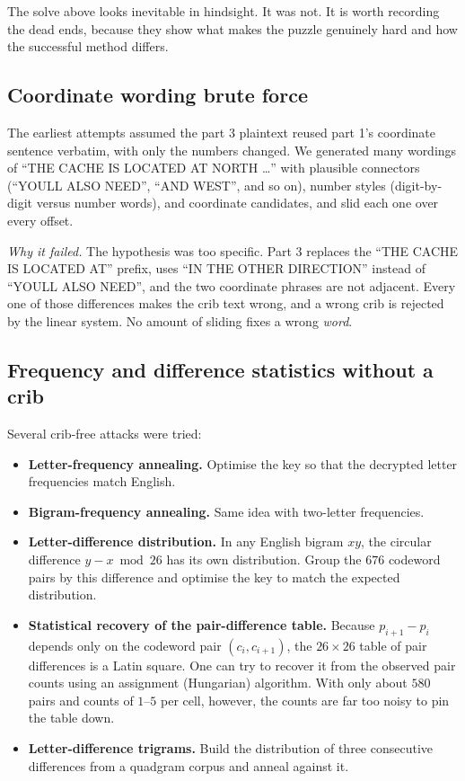 \documentclass[11pt]{article}
\begin{document}
The solve above looks inevitable in hindsight.  It was not.  It is worth
recording the dead ends, because they show what makes the puzzle genuinely
hard and how the successful method differs.

\subsection{Coordinate wording brute force}

The earliest attempts assumed the part 3 plaintext reused part 1's coordinate
sentence verbatim, with only the numbers changed.  We generated many wordings
of ``THE CACHE IS LOCATED AT NORTH \dots'' with plausible connectors
(``YOULL ALSO NEED'', ``AND WEST'', and so on), number styles (digit-by-digit
versus number words), and coordinate candidates, and slid each one over every
offset.

\emph{Why it failed.}  The hypothesis was too specific.  Part 3 replaces the
``THE CACHE IS LOCATED AT'' prefix, uses ``IN THE OTHER DIRECTION'' instead of
``YOULL ALSO NEED'', and the two coordinate phrases are not adjacent.  Every
one of those differences makes the crib text wrong, and a wrong crib is
rejected by the linear system.  No amount of sliding fixes a wrong \emph{word}.

\subsection{Frequency and difference statistics without a crib}

Several crib-free attacks were tried:

\begin{itemize}
  \item \textbf{Letter-frequency annealing.} Optimise the key so that the
        decrypted letter frequencies match English.
  \item \textbf{Bigram-frequency annealing.} Same idea with two-letter
        frequencies.
  \item \textbf{Letter-difference distribution.} In any English bigram
        $xy$, the circular difference $y-x \bmod 26$ has its own distribution.
        Group the $676$ codeword pairs by this difference and optimise the key
        to match the expected distribution.
  \item \textbf{Statistical recovery of the pair-difference table.} Because
        $p_{i+1}-p_i$ depends only on the codeword pair $(c_i,c_{i+1})$, the
        $26\times26$ table of pair differences is a Latin square.  One can try
        to recover it from the observed pair counts using an assignment
        (Hungarian) algorithm.  With only about $580$ pairs and counts of
        $1$--$5$ per cell, however, the counts are far too noisy to pin the
        table down.
  \item \textbf{Letter-difference trigrams.} Build the distribution of three
        consecutive differences from a quadgram corpus and anneal against it.
\end{itemize}
\end{document}
